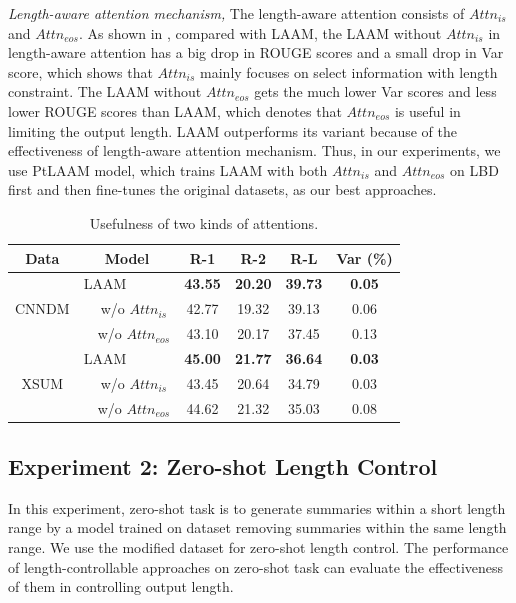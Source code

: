 \textit{Length-aware attention mechanism,}
The length-aware attention consists of $Attn_{is}$ and $Attn_{eos}$.
As shown in ,
compared with LAAM, 
the LAAM without $Attn_{is}$ in length-aware attention has a big drop in ROUGE scores
and a small drop in Var score,
which shows that $Attn_{is}$ mainly focuses on select information with length constraint.
The LAAM without $Attn_{eos}$ gets the much lower Var scores and less lower ROUGE scores than LAAM,
which denotes that $Attn_{eos}$ is useful in limiting the output length.
LAAM outperforms its variant because of the effectiveness of length-aware attention mechanism. Thus, in our experiments, 
we use PtLAAM model, which trains LAAM with both $Attn_{is}$ and $Attn_{eos}$
on LBD first and then fine-tunes the original datasets, as our best approaches.

\begin{table}[th]
	\centering
	\scriptsize
	\begin{tabular}{|c|lc|c|c|c|c|}
		\hline 
		Data & \multicolumn{2}{c|}{Model} & R-1 & R-2&R-L&Var (\%)\\
		\hline
		\multirow{3}{*}{CNNDM} & \multicolumn{2}{l|}{LAAM} & \bf 43.55& \bf 20.20 & \bf 39.73 &\bf 0.05  \\ 
		&&w/o $Attn_{is}$ & 42.77 &  19.32 & 39.13 & 0.06\\
		&&w/o $Attn_{eos}$ & 43.10 &  20.17 & 37.45 & 0.13\\
		\hline
		\multirow{3}{*}{XSUM} &\multicolumn{2}{l|}{LAAM} & \bf 45.00 & \bf 21.77 & \bf 36.64 & \bf 0.03 \\ 
		&&w/o $Attn_{is}$ & 43.45 & 20.64 & 34.79 & 0.03 \\
		&&w/o $Attn_{eos}$ & 44.62 &  21.32 & 35.03 & 0.08\\
		\hline
	\end{tabular}
	\caption{Usefulness of two kinds of attentions.} 
	\label{tab:lenattn}  
\end{table}

\subsection{Experiment 2: Zero-shot Length Control}
\label{sec:zeroshot}
In this experiment, zero-shot task is to generate summaries within a short length range by a model trained on dataset removing summaries within the same length range. We use the modified dataset for zero-shot length control.
The performance of length-controllable approaches on zero-shot task can evaluate the effectiveness of them in controlling output length.

